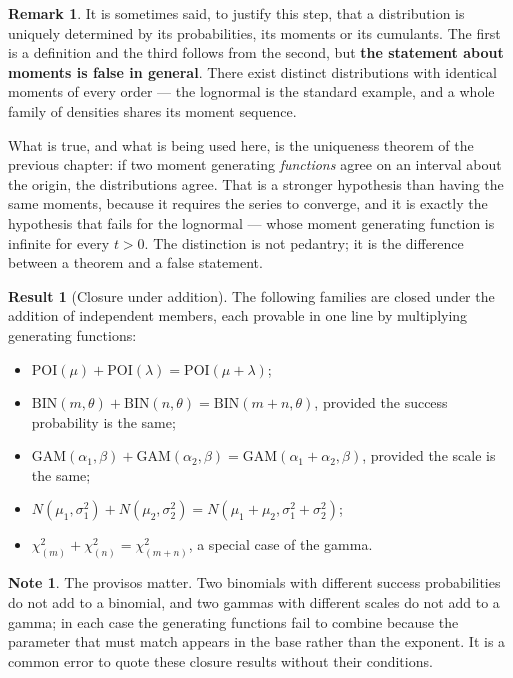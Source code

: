 \documentclass[11pt,a4paper]{article}
\theoremstyle{definition}
\newtheorem{result}[thm]{Result}
\newtheorem*{note}{Note}
\newtheorem*{remark}{Remark}
\begin{document}
\begin{remark}
It is sometimes said, to justify this step, that a distribution is uniquely
determined by its probabilities, its moments or its cumulants. The
first is a definition and the third follows from the second, but \textbf{the
statement about moments is false in general}. There exist distinct
distributions with identical moments of every order --- the lognormal is the
standard example, and a whole family of densities shares its moment sequence.

What is true, and what is being used here, is the uniqueness theorem of the
previous chapter: if two moment generating \emph{functions} agree on an interval
about the origin, the distributions agree. That is a stronger hypothesis than
having the same moments, because it requires the series to converge, and it is
exactly the hypothesis that fails for the lognormal --- whose moment generating
function is infinite for every $t>0$. The distinction is not pedantry; it is the
difference between a theorem and a false statement.
\end{remark}

\begin{result}[Closure under addition]
The following families are closed under the addition of independent members,
each provable in one line by multiplying generating functions:
\begin{itemize}
\item $\text{POI}(\mu) + \text{POI}(\lambda) = \text{POI}(\mu+\lambda)$;
\item $\text{BIN}(m,\theta) + \text{BIN}(n,\theta) = \text{BIN}(m+n,\theta)$,
provided the success probability is the same;
\item $\text{GAM}(\alpha_1,\beta) + \text{GAM}(\alpha_2,\beta)
= \text{GAM}(\alpha_1+\alpha_2,\beta)$, provided the scale is the same;
\item $N\left(\mu_1,\sigma_1^{2}\right) + N\left(\mu_2,\sigma_2^{2}\right)
= N\left(\mu_1+\mu_2,\sigma_1^{2}+\sigma_2^{2}\right)$;
\item $\chi^{2}_{(m)} + \chi^{2}_{(n)} = \chi^{2}_{(m+n)}$, a special case
of the gamma.
\end{itemize}
\end{result}

\begin{note}
The provisos matter. Two binomials with different success probabilities do not
add to a binomial, and two gammas with different scales do not add to a gamma;
in each case the generating functions fail to combine because the parameter that
must match appears in the base rather than the exponent. It is a common error to
quote these closure results without their conditions.
\end{note}
\end{document}

